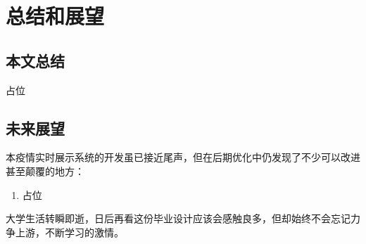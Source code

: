 

\chapter{总结和展望 }

\section{本文总结}
占位

 
\section{未来展望}
 本疫情实时展示系统的开发虽已接近尾声，但在后期优化中仍发现了不少可以改进甚至颠覆的地方：
 \begin{enumerate}
 	\item 占位
 \end{enumerate}
大学生活转瞬即逝，日后再看这份毕业设计应该会感触良多，但却始终不会忘记力争上游，不断学习的激情。




